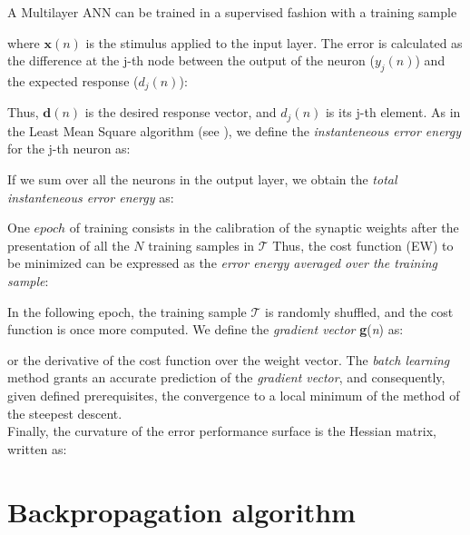 A Multilayer \acs{ANN} can be trained in a supervised fashion with a training
sample

where $\mathbf{x}(n)$ is the stimulus applied to the input layer.
The error is calculated 
as the difference at the j-th
node between the output of the neuron ($y_j(n)$) and the expected response
($d_j(n)$):

Thus, $\mathbf{d}(n)$ is the desired response vector, and $d_j(n)$ is its j-th
element.
As in the Least Mean Square algorithm (see \citet{RefWorks:158}), we define
the \textit{instanteneous error energy} for the j-th neuron as:

If we sum over all the neurons in the output layer, we obtain
the \textit{total instanteneous error energy} as:

One $epoch$ of training consists in the calibration of the synaptic weights
after the presentation of all the $N$ training samples in $\mathscr{T}$
Thus,
the cost function (\acs{EW}) to be minimized can be
expressed as the \textit{error energy averaged over the training sample}:

In the following epoch, the training sample $\mathscr{T}$ is randomly shuffled,
and the cost function is once more computed.
We define the \textit{gradient vector}
\textbf{g}(\textit{n}) as:

or the derivative of the cost function over the  weight vector.
The \textit{batch learning} method grants an accurate prediction of the
\textit{gradient vector}, and consequently, given defined prerequisites, the
convergence to a local minimum of the method of the steepest descent.\\
Finally, the curvature of the error performance surface is the Hessian matrix,
written as:


\section{Backpropagation algorithm}
\label{sec:backpropagationalgorithm}

